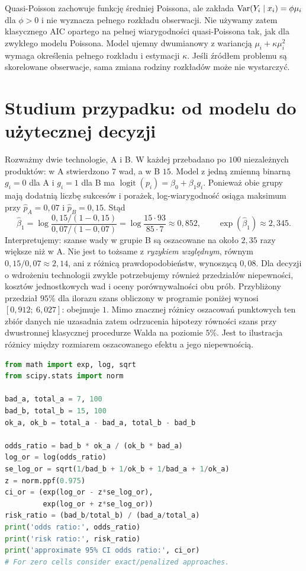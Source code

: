\begin{uwaga}
Quasi-Poisson zachowuje funkcję średniej Poissona,
ale zakłada $\operatorname{Var}(Y_i\mid x_i)=\phi\mu_i$ dla
$\phi>0$ i nie wyznacza pełnego rozkładu obserwacji.
Nie używamy zatem klasycznego AIC opartego na
pełnej wiarygodności quasi-Poissona tak, jak dla
zwykłego modelu Poissona. Model ujemny dwumianowy
z wariancją $\mu_i+\kappa\mu_i^2$ wymaga określenia
pełnego rozkładu i estymacji $\kappa$.
Jeśli źródłem problemu są skorelowane obserwacje,
sama zmiana rodziny rozkładów może nie wystarczyć.
\end{uwaga}

\section{Studium przypadku: od modelu do użytecznej decyzji}
Rozważmy dwie technologie, A i B. W każdej przebadano
po $100$ niezależnych produktów: w A stwierdzono
$7$ wad, a w B $15$. Model z jedną zmienną binarną
$g_i=0$ dla A i $g_i=1$ dla B ma
$\operatorname{logit}(p_i)=\beta_0+\beta_1g_i$.
Ponieważ obie grupy mają dodatnią liczbę sukcesów
i porażek, log-wiarygodność osiąga maksimum
przy $\widehat p_A=0{,}07$ i $\widehat p_B=0{,}15$.
Stąd
\[
 \widehat\beta_1=
 \log\frac{0{,}15/(1-0{,}15)}{0{,}07/(1-0{,}07)}
 =\log\frac{15\cdot93}{85\cdot7}
 \approx0{,}852,\qquad
 \exp(\widehat\beta_1)\approx2{,}345.
\]
Interpretujemy: szanse wady w grupie B są oszacowane
na około $2{,}35$ razy większe niż w A. Nie jest to
tożsame z \emph{ryzykiem względnym}, równym
$0{,}15/0{,}07\approx2{,}14$, ani z różnicą
prawdopodobieństw, wynoszącą $0{,}08$.
Dla decyzji o wdrożeniu technologii zwykle potrzebujemy
również przedziałów niepewności, kosztów jednostkowych
wad i oceny porównywalności obu prób. Przybliżony
przedział $95\%$ dla ilorazu szans obliczony w programie
poniżej wynosi $[0{,}912;\ 6{,}027]$: obejmuje $1$.
Mimo znacznej różnicy oszacowań punktowych ten zbiór
danych nie uzasadnia zatem odrzucenia hipotezy równości
szans przy dwustronnej klasycznej procedurze Walda
na poziomie $5\%$. Jest to ilustracja różnicy między
rozmiarem oszacowanego efektu a jego niepewnością.

\begin{lstlisting}[language=Python,caption={Kompletny program: dwie grupy binarne, iloraz szans i przedział przybliżony (Python).}]
from math import exp, log, sqrt
from scipy.stats import norm

bad_a, total_a = 7, 100
bad_b, total_b = 15, 100
ok_a, ok_b = total_a - bad_a, total_b - bad_b

odds_ratio = bad_b * ok_a / (ok_b * bad_a)
log_or = log(odds_ratio)
se_log_or = sqrt(1/bad_b + 1/ok_b + 1/bad_a + 1/ok_a)
z = norm.ppf(0.975)
ci_or = (exp(log_or - z*se_log_or),
         exp(log_or + z*se_log_or))
risk_ratio = (bad_b/total_b) / (bad_a/total_a)
print('odds ratio:', odds_ratio)
print('risk ratio:', risk_ratio)
print('approximate 95% CI odds ratio:', ci_or)
# For zero cells consider exact/penalized approaches.
\end{lstlisting}

